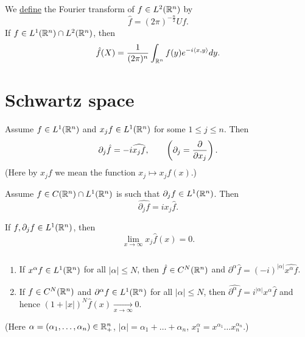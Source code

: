 \begin{definition}
    We \underline{define} the Fourier transform of $f\in L^2(\mathbb{R}^n)$ by \[\hat f = (2\pi)^{-\frac{n}{2}} Uf.\]
If $f\in L^1(\mathbb{R}^n)\cap L^2(\mathbb{R}^n)$, then \[\hat f(X)=\frac{1}{(2\pi)^n}\int_{\mathbb{R}^n}f(y)e^{-i\langle x,y\rangle}dy.\]
\end{definition}


\section*{Schwartz space}
\begin{proposition}
    Assume $f\in L^1(\mathbb{R}^n)$ and $x_j f\in L^1(\mathbb{R}^n)$ for some $1\leq j\leq n$. Then \[\partial_j \hat f = -i\widehat{x_j f},\hspace{7mm}\left(\partial_j = \frac{\partial}{\partial x_j}\right). \]
    (Here by $x_jf$ we mean the function $x_j\mapsto x_j f(x)$.)
\end{proposition}

\begin{proposition}
    Assume $f\in C(\mathbb{R}^n)\cap L^1(\mathbb{R}^n)$ is such that $\partial_j f\in L^1(\mathbb{R}^n)$. Then \[\widehat{\partial_j f} = ix_j\hat f.\]
\end{proposition}

\begin{corollary}
    If $f,\partial_j f\in L^1(\mathbb{R}^n)$, then \[\lim_{x\rightarrow \infty}x_j \hat f(x)=0.\]
\end{corollary}

\begin{corollary}
    $$\quad$$
    \begin{enumerate}
        \item If $x^\alpha f \in L^1(\mathbb{R}^n)$ for all $|\alpha|\leq N$, then $\hat f \in C^N(\mathbb{R}^n)$ and $\partial^\alpha \hat f=(-i)^{|\alpha|}\widehat{x^\alpha f}$.
        \item If $f\in C^N(\mathbb{R}^n)$ and $\partial^\alpha f\in L^1(\mathbb{R}^n)$ for all $|\alpha|\leq N$, then $\widehat{\partial^\alpha f} = i^{|\alpha|}x^\alpha \hat f$ and hence $(1+|x|)^N\hat f(x)\xrightarrow[x\rightarrow\infty]{}0.$ 
    \end{enumerate}
    (Here $\alpha = (\alpha_1,\ldots,\alpha_n)\in \mathbb{R}_+^n$, $|\alpha|=\alpha_1+\ldots+\alpha_n$, $x_1^\alpha = x^{\alpha_1}\ldots x_n^{\alpha_n}$.)
\end{corollary}

